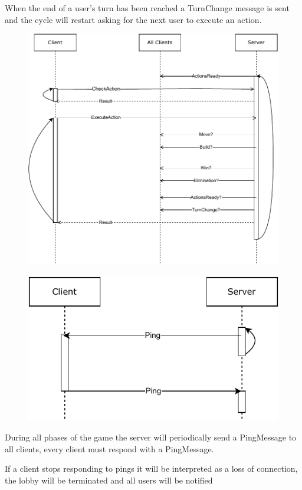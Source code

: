 \documentclass{article}
\begin{document}
When the end of a user's turn has been reached a TurnChange message is sent and the cycle will restart asking for the next user to execute an action.

\begin{figure}[H]
    \centering
    \includegraphics[width=0.85\linewidth]{communication_uml_3.pdf}
\end{figure}

\begin{figure}
    \centering
    \includegraphics[width=\linewidth]{communication_uml_4.pdf}
\end{figure}

During all phases of the game the server will periodically send a PingMessage to all clients, every client must respond with a PingMessage.

If a client stops responding to pings it will be interpreted as a loss of connection, the lobby will be terminated and all users will be notified
\end{document}
